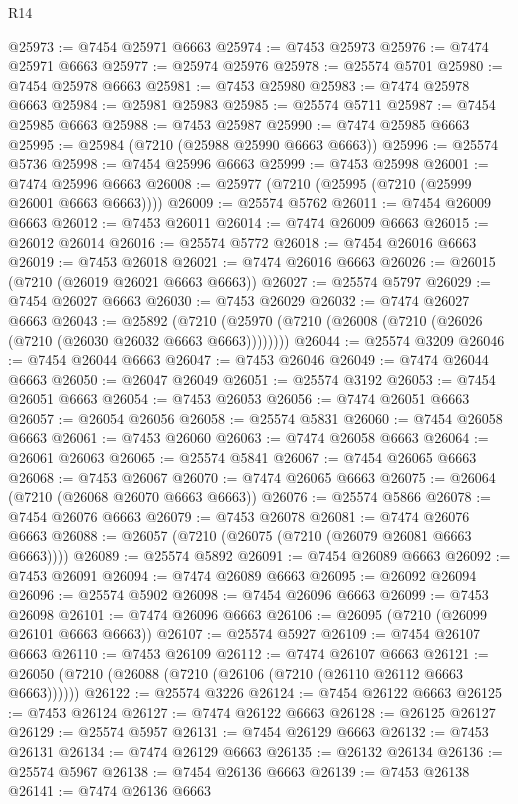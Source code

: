 \begin{lexlean}{R14}
\begin{coremodule}
@25973 := @7454 @25971 @6663
@25974 := @7453 @25973
@25976 := @7474 @25971 @6663
@25977 := @25974 @25976
@25978 := @25574 @5701
@25980 := @7454 @25978 @6663
@25981 := @7453 @25980
@25983 := @7474 @25978 @6663
@25984 := @25981 @25983
@25985 := @25574 @5711
@25987 := @7454 @25985 @6663
@25988 := @7453 @25987
@25990 := @7474 @25985 @6663
@25995 := @25984 (@7210 (@25988 @25990 @6663 @6663))
@25996 := @25574 @5736
@25998 := @7454 @25996 @6663
@25999 := @7453 @25998
@26001 := @7474 @25996 @6663
@26008 := @25977 (@7210 (@25995 (@7210 (@25999 @26001 @6663 @6663))))
@26009 := @25574 @5762
@26011 := @7454 @26009 @6663
@26012 := @7453 @26011
@26014 := @7474 @26009 @6663
@26015 := @26012 @26014
@26016 := @25574 @5772
@26018 := @7454 @26016 @6663
@26019 := @7453 @26018
@26021 := @7474 @26016 @6663
@26026 := @26015 (@7210 (@26019 @26021 @6663 @6663))
@26027 := @25574 @5797
@26029 := @7454 @26027 @6663
@26030 := @7453 @26029
@26032 := @7474 @26027 @6663
@26043 := @25892
    (@7210 (@25970 (@7210 (@26008 (@7210 (@26026 (@7210 (@26030 @26032 @6663 @6663))))))))
@26044 := @25574 @3209
@26046 := @7454 @26044 @6663
@26047 := @7453 @26046
@26049 := @7474 @26044 @6663
@26050 := @26047 @26049
@26051 := @25574 @3192
@26053 := @7454 @26051 @6663
@26054 := @7453 @26053
@26056 := @7474 @26051 @6663
@26057 := @26054 @26056
@26058 := @25574 @5831
@26060 := @7454 @26058 @6663
@26061 := @7453 @26060
@26063 := @7474 @26058 @6663
@26064 := @26061 @26063
@26065 := @25574 @5841
@26067 := @7454 @26065 @6663
@26068 := @7453 @26067
@26070 := @7474 @26065 @6663
@26075 := @26064 (@7210 (@26068 @26070 @6663 @6663))
@26076 := @25574 @5866
@26078 := @7454 @26076 @6663
@26079 := @7453 @26078
@26081 := @7474 @26076 @6663
@26088 := @26057 (@7210 (@26075 (@7210 (@26079 @26081 @6663 @6663))))
@26089 := @25574 @5892
@26091 := @7454 @26089 @6663
@26092 := @7453 @26091
@26094 := @7474 @26089 @6663
@26095 := @26092 @26094
@26096 := @25574 @5902
@26098 := @7454 @26096 @6663
@26099 := @7453 @26098
@26101 := @7474 @26096 @6663
@26106 := @26095 (@7210 (@26099 @26101 @6663 @6663))
@26107 := @25574 @5927
@26109 := @7454 @26107 @6663
@26110 := @7453 @26109
@26112 := @7474 @26107 @6663
@26121 := @26050 (@7210 (@26088 (@7210 (@26106 (@7210 (@26110 @26112 @6663 @6663))))))
@26122 := @25574 @3226
@26124 := @7454 @26122 @6663
@26125 := @7453 @26124
@26127 := @7474 @26122 @6663
@26128 := @26125 @26127
@26129 := @25574 @5957
@26131 := @7454 @26129 @6663
@26132 := @7453 @26131
@26134 := @7474 @26129 @6663
@26135 := @26132 @26134
@26136 := @25574 @5967
@26138 := @7454 @26136 @6663
@26139 := @7453 @26138
@26141 := @7474 @26136 @6663

\end{coremodule}
\end{lexlean}
